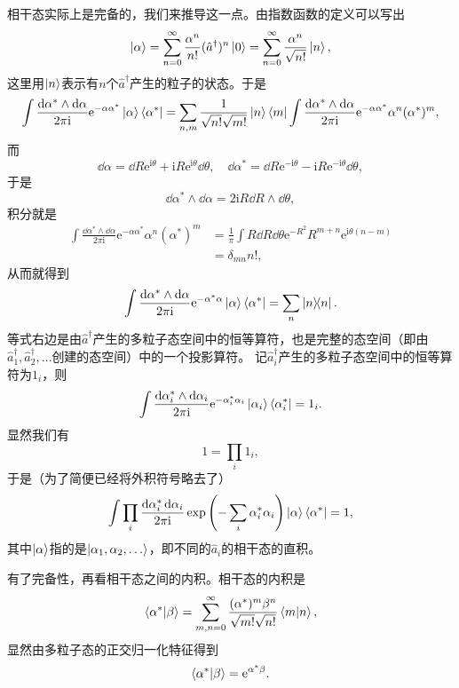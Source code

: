\documentclass[hyperref, UTF8, a4paper]{ctexart}
\newcommand*{\ii}{\mathrm{i}}
\newcommand*{\ee}{\mathrm{e}}
\begin{document}
相干态实际上是完备的，我们来推导这一点。由指数函数的定义可以写出
\[
    \ket{\alpha} = \sum_{n=0}^\infty \frac{\alpha^n}{n!} (\hat{a}^\dagger)^n \ket{0} =  \sum_{n=0}^\infty \frac{\alpha^n}{\sqrt{n!}} \ket{n} ,
\]
这里用$\ket{n}$表示有$n$个$\hat{a}^\dagger$产生的粒子的状态。于是
\[
    \int \frac{\dd{\alpha^*} \wedge \dd{\alpha}}{2\pi \ii} \ee^{- \alpha \alpha^*} \ket{\alpha} \bra{\alpha^*} = \sum_{n, m} \frac{1}{\sqrt{n!}\sqrt{m!}} \ket{n} \bra{m} \int \frac{\dd{\alpha^*} \wedge \dd{\alpha}}{2\pi \ii} \ee^{- \alpha \alpha^*} \alpha^n (\alpha^*)^m,
\]
而
\[
    \dd{\alpha} = \dd{R} \ee^{\ii \theta} + \ii R \ee^{\ii \theta} \dd{\theta}, \quad \dd{\alpha^*} = \dd{R} \ee^{- \ii \theta} - \ii R \ee^{- \ii \theta} \dd{\theta},
\]
于是
\[
    \dd{\alpha^*} \wedge \dd{\alpha} = 2 \ii R \dd{R} \wedge \dd{\theta},
\]
积分就是
\[
    \begin{aligned}
        \int \frac{\dd{\alpha^*} \wedge \dd{\alpha}}{2\pi \ii} \ee^{- \alpha \alpha^*} \alpha^n (\alpha^*)^m &= \frac{1}{\pi} \int R \dd{R} \dd{\theta} \ee^{-R^2} R^{m+n} \ee^{\ii \theta (n-m)} \\
        &= \delta_{mn} n!,
    \end{aligned}
\]
从而就得到
\[
    \int \frac{\dd{\alpha^*} \wedge \dd{\alpha}}{2\pi \ii} \ee^{- \alpha^* \alpha} \ket{\alpha} \bra{\alpha^*} = \sum_n \dyad{n}.
\]
等式右边是由$\hat{a}^\dagger$产生的多粒子态空间中的恒等算符，也是完整的态空间（即由$\hat{a}^\dagger_1, \hat{a}^\dagger_2, \ldots$创建的态空间）中的一个投影算符。
记$\hat{a}^\dagger_i$产生的多粒子态空间中的恒等算符为$1_i$，则
\[
    \int \frac{\dd{\alpha^*_i} \wedge \dd{\alpha}_i}{2\pi \ii} \ee^{- \alpha_i^* \alpha_i} \ket{\alpha_i} \bra{\alpha^*_i} = 1_i.
\]
显然我们有
\[
    1 = \prod_i 1_i,
\]
于是（为了简便已经将外积符号略去了）
\[
    \int \prod_i \frac{\dd{\alpha_i^*} \dd{\alpha_i}}{2\pi \ii} \exp \left( - \sum_i \alpha_i^* \alpha_i \right) \ket{\alpha} \bra{\alpha^*} = 1,
\]
其中$\ket{\alpha}$指的是$\ket{\alpha_1, \alpha_2, \ldots}$，即不同的$\hat{a}_i$的相干态的直积。

有了完备性，再看相干态之间的内积。相干态的内积是
\[
    \braket{\alpha^*}{\beta} = \sum_{m,n = 0}^\infty \frac{(\alpha^*)^m \beta^n}{\sqrt{m!} \sqrt{n!}} \braket{m}{n}, 
\]
显然由多粒子态的正交归一化特征得到
\[
    \braket{\alpha^*}{\beta} = \ee^{\alpha^* \beta}.
\]
\end{document}
